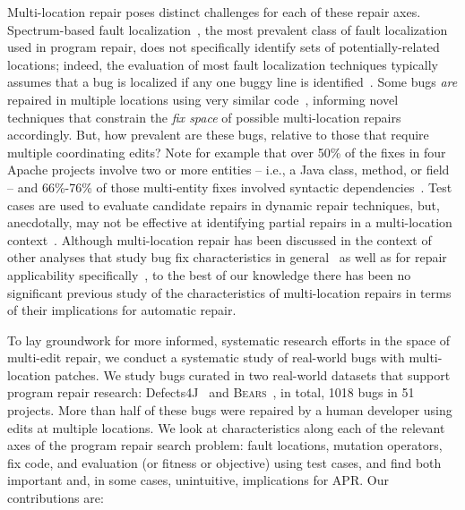 \documentclass[10pt, conference]{IEEEtran}
\newcommand\bears{\textsc{Bears}\xspace}
\begin{document}
Multi-location repair poses distinct challenges for each of these repair axes.
Spectrum-based fault localization~\cite{ochiai}, the most prevalent class of
fault localization used in program repair, does not specifically
identify sets of potentially-related locations; indeed,
the evaluation of most fault localization techniques typically assumes that a bug
is localized if any one buggy line is identified~\cite{fl-survey-wong}.
Some bugs \emph{are}
repaired in multiple locations using very similar
code~\cite{saha2019harnessing,jiang2019cmsuggester}, informing novel techniques
that constrain the \emph{fix space} of possible multi-location repairs accordingly.
But, how prevalent are these bugs, 
relative to those that require multiple
coordinating edits?
Note for example that over 50\% of the fixes in four 
Apache projects involve two or more entities -- i.e., a Java class, method, or field -- and 66\%-76\% of 
those multi-entity fixes involved syntactic dependencies~\cite{wang2018}. 
Test cases are used to evaluate candidate repairs in dynamic
repair techniques, but, anecdotally, may not be effective
at identifying partial repairs in a multi-location
context~\cite{better-fitness}.  
Although multi-location repair has been discussed in the context of other analyses
that study bug fix characteristics in general~\cite{d4j-dissection} as well as for
repair applicability specifically~\cite{zhong2015, wang2018}, 
to the best of our
knowledge there has been no significant previous study of the characteristics of
multi-location repairs in terms of their implications for automatic
repair.

To lay groundwork for more informed, systematic research
efforts in the space of multi-edit repair, we conduct a systematic study of real-world bugs with
multi-location patches.  We study bugs curated in two
real-world datasets that support program repair research: Defects4J~\cite{defects4j}
and \bears~\cite{bears}, in total, 1018 bugs in 51 projects.
More than half of these bugs were repaired by a
human developer using edits at multiple locations.  We look at characteristics along each of the
relevant axes of the program repair search problem: fault locations, mutation
operators, fix code, and evaluation (or fitness or objective) using test cases,
and find both important and, in some cases, unintuitive, implications for
APR.  Our contributions are:
\end{document}
